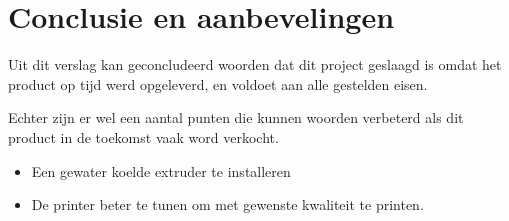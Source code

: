 \chapter{Conclusie en aanbevelingen}
\label{Conclusie_en_aanbevelingen}

Uit dit verslag kan geconcludeerd woorden dat dit project geslaagd is omdat het
product op tijd werd opgeleverd, en voldoet aan alle gestelden eisen.

Echter zijn er wel een aantal punten die kunnen woorden verbeterd als dit
product in de toekomst vaak word verkocht.

\begin{itemize}
    \item Een gewater koelde extruder te installeren
    \item De printer beter te tunen om met gewenste kwaliteit te printen.
\end{itemize}